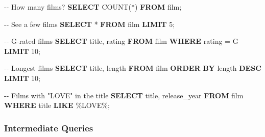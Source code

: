 \documentclass[
  letterpaper,
  DIV=11,
  numbers=noendperiod]{scrartcl}
\newenvironment{Shaded}{\begin{snugshade}}{\end{snugshade}}
\newcommand{\CommentTok}[1]{\textcolor[rgb]{0.37,0.37,0.37}{#1}}
\newcommand{\DecValTok}[1]{\textcolor[rgb]{0.68,0.00,0.00}{#1}}
\newcommand{\FunctionTok}[1]{\textcolor[rgb]{0.28,0.35,0.67}{#1}}
\newcommand{\KeywordTok}[1]{\textcolor[rgb]{0.00,0.23,0.31}{\textbf{#1}}}
\newcommand{\NormalTok}[1]{\textcolor[rgb]{0.00,0.23,0.31}{#1}}
\newcommand{\OperatorTok}[1]{\textcolor[rgb]{0.37,0.37,0.37}{#1}}
\newcommand{\StringTok}[1]{\textcolor[rgb]{0.13,0.47,0.30}{#1}}
\begin{document}
\begin{Shaded}
\begin{Highlighting}[]
\CommentTok{{-}{-} How many films?}
\KeywordTok{SELECT} \FunctionTok{COUNT}\NormalTok{(}\OperatorTok{*}\NormalTok{) }\KeywordTok{FROM}\NormalTok{ film;}

\CommentTok{{-}{-} See a few films}
\KeywordTok{SELECT} \OperatorTok{*} \KeywordTok{FROM}\NormalTok{ film }\KeywordTok{LIMIT} \DecValTok{5}\NormalTok{;}

\CommentTok{{-}{-} G{-}rated films}
\KeywordTok{SELECT}\NormalTok{ title, rating }\KeywordTok{FROM}\NormalTok{ film }\KeywordTok{WHERE}\NormalTok{ rating }\OperatorTok{=} \StringTok{\textquotesingle{}G\textquotesingle{}} \KeywordTok{LIMIT} \DecValTok{10}\NormalTok{;}

\CommentTok{{-}{-} Longest films}
\KeywordTok{SELECT}\NormalTok{ title, }\FunctionTok{length} \KeywordTok{FROM}\NormalTok{ film }\KeywordTok{ORDER} \KeywordTok{BY} \FunctionTok{length} \KeywordTok{DESC} \KeywordTok{LIMIT} \DecValTok{10}\NormalTok{;}

\CommentTok{{-}{-} Films with "LOVE" in the title}
\KeywordTok{SELECT}\NormalTok{ title, release\_year }\KeywordTok{FROM}\NormalTok{ film }\KeywordTok{WHERE}\NormalTok{ title }\KeywordTok{LIKE} \StringTok{\textquotesingle{}\%LOVE\%\textquotesingle{}}\NormalTok{;}
\end{Highlighting}
\end{Shaded}

\subsubsection{Intermediate Queries}\label{intermediate-queries}
\end{document}
